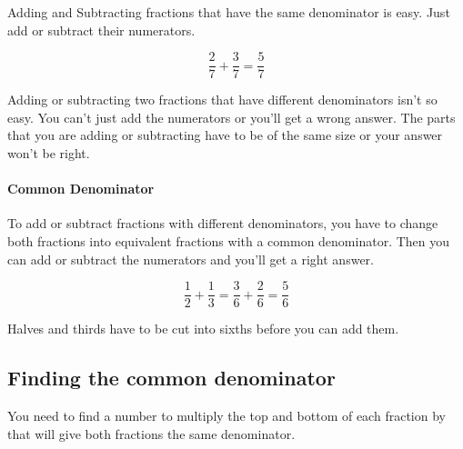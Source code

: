 \documentclass[14pt]{article}
\begin{document}
\begin{enumerate}
Adding and Subtracting fractions that have the same denominator is easy. Just add or subtract their numerators.

$$\frac{2}{7}+\frac{3}{7}=\frac{5}{7}$$

Adding or subtracting two fractions that have different denominators isn't so easy. You can't just add the numerators or you'll get a wrong answer. The parts that you are adding or subtracting have to be of the same size or your answer won’t be right.

\paragraph{Common Denominator}
To add or subtract fractions with different denominators, you have to change both fractions into equivalent fractions with a common denominator. Then you can add or subtract the numerators and you’ll get a right answer.\\


$$\frac{1}{2} + \frac{1}{3} = \frac{3}{6} + \frac{2}{6} = \frac{5}{6}$$

Halves and thirds have to be cut into sixths before you can add them.

\newpage

\subsection*{Finding the common denominator}
You need to find a number to multiply the top and bottom of each fraction by that will give both fractions the same denominator.


\end{enumerate}
\end{document}
